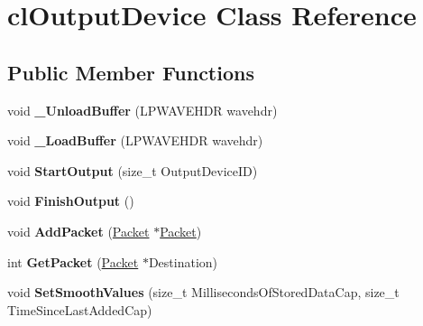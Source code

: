 \hypertarget{classcl_output_device}{
\section{clOutputDevice Class Reference}
\label{classcl_output_device}
}
\subsection*{Public Member Functions}
\begin{DoxyCompactItemize}
\item 
\hypertarget{classcl_output_device_ae3b3a5196eeffceecec775db3d89c8ba}{
void {\bfseries \_\-UnloadBuffer} (LPWAVEHDR wavehdr)}
\label{classcl_output_device_ae3b3a5196eeffceecec775db3d89c8ba}

\item 
\hypertarget{classcl_output_device_a2b80312182f7873c31037a1f35c0f60e}{
void {\bfseries \_\-LoadBuffer} (LPWAVEHDR wavehdr)}
\label{classcl_output_device_a2b80312182f7873c31037a1f35c0f60e}

\item 
\hypertarget{classcl_output_device_a41d337dcccfc9d1aaf4c5a306e695e36}{
void {\bfseries StartOutput} (size\_\-t OutputDeviceID)}
\label{classcl_output_device_a41d337dcccfc9d1aaf4c5a306e695e36}

\item 
\hypertarget{classcl_output_device_a63d890362fd04db965c8498844eccbb1}{
void {\bfseries FinishOutput} ()}
\label{classcl_output_device_a63d890362fd04db965c8498844eccbb1}

\item 
\hypertarget{classcl_output_device_aeb881cd1f2018fd70054b9c3265cd87f}{
void {\bfseries AddPacket} (\hyperlink{class_packet}{Packet} $\ast$\hyperlink{class_packet}{Packet})}
\label{classcl_output_device_aeb881cd1f2018fd70054b9c3265cd87f}

\item 
\hypertarget{classcl_output_device_a2a9f998cb2d8a28e0fd7bdecef9e05fe}{
int {\bfseries GetPacket} (\hyperlink{class_packet}{Packet} $\ast$Destination)}
\label{classcl_output_device_a2a9f998cb2d8a28e0fd7bdecef9e05fe}

\item 
\hypertarget{classcl_output_device_af906e70499e9a3fe7c5db43887c21355}{
void {\bfseries SetSmoothValues} (size\_\-t MillisecondsOfStoredDataCap, size\_\-t TimeSinceLastAddedCap)}
\label{classcl_output_device_af906e70499e9a3fe7c5db43887c21355}


\end{DoxyCompactItemize}
